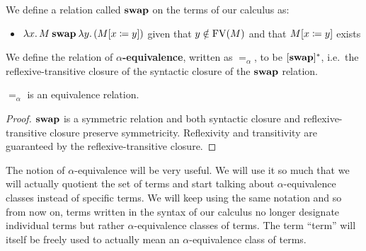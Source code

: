 \begin{definition}
  We define a relation called $\mathbin{\textbf{swap}}$ on the terms of our calculus as:

  \begin{itemize}
  \item $\lambda x.\, M \mathbin{\textbf{swap}} \lambda y.\, (M[x \coloneqq y])$ given that $y \notin
    \operatorname{FV}(M)$ and that $M[x \coloneqq y]$ exists



    
  \end{itemize}
\end{definition}

\begin{definition}
  We define the relation of \textbf{$\alpha$-equivalence}, written as
  $=_\alpha$, to be $[\mathbin{\textbf{swap}}]^*$, i.e.\ the reflexive-transitive closure of
  the syntactic closure of the $\mathbin{\textbf{swap}}$ relation.
\end{definition}

\begin{observation}
  $=_\alpha$ is an equivalence relation.
\end{observation}
\begin{proof}
  $\mathbin{\textbf{swap}}$ is a symmetric relation and both syntactic closure and
  reflexive-transitive closure preserve symmetricity. Reflexivity and
  transitivity are guaranteed by the reflexive-transitive closure.
\end{proof}

The notion of $\alpha$-equivalence will be very useful. We will use it so
much that we will actually quotient the set of terms and start talking
about $\alpha$-equivalence classes instead of specific terms. We will keep
using the same notation and so from now on, terms written in the syntax of
our calculus no longer designate individual terms but rather
$\alpha$-equivalence classes of terms. The term ``term'' will itself be
freely used to actually mean an $\alpha$-equivalence class of terms.

